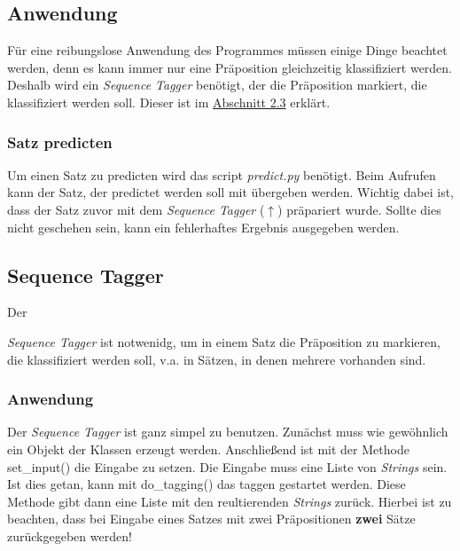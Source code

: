 \documentclass[10pt,a4paper]{article}
\begin{document}
\subsection{Anwendung}
\begin{flushleft}
Für eine reibungslose Anwendung des Programmes müssen einige Dinge beachtet werden, denn es kann immer nur eine Präposition gleichzeitig klassifiziert werden. Deshalb wird ein \textit{Sequence Tagger} benötigt, der die Präposition markiert, die klassifiziert werden soll. Dieser ist im \hyperlink{SeqTag}{Abschnitt 2.3} erklärt.
\end{flushleft}

\subsubsection{Satz predicten}
\begin{flushleft}
Um einen Satz zu predicten wird das script \textit{predict.py} benötigt. Beim Aufrufen kann der Satz, der predictet werden soll mit übergeben werden. Wichtig dabei ist, dass der Satz zuvor mit dem \textit{Sequence Tagger} (\hyperlink{SeqTag}{$\uparrow$}) präpariert wurde. Sollte dies nicht geschehen sein, kann ein fehlerhaftes Ergebnis ausgegeben werden.
\end{flushleft}

\subsection{Sequence Tagger}
\begin{flushleft}
\hypertarget{SeqTag}{Der} \textit{Sequence Tagger} ist notwenidg, um in einem Satz die Präposition zu markieren, die klassifiziert werden soll, v.a. in Sätzen, in denen mehrere vorhanden sind.
\end{flushleft}

\subsubsection{Anwendung}
\begin{flushleft}
Der \textit{Sequence Tagger} ist ganz simpel zu benutzen. Zunächst muss wie gewöhnlich ein Objekt der Klassen erzeugt werden. Anschließend ist mit der Methode set\_input() die Eingabe zu setzen. Die Eingabe muss eine Liste von \textit{Strings} sein. Ist dies getan, kann mit do\_tagging() das taggen gestartet werden. Diese Methode gibt dann eine Liste mit den reultierenden \textit{Strings} zurück. Hierbei ist zu beachten, dass bei Eingabe eines Satzes mit zwei Präpositionen \textbf{zwei} Sätze zurückgegeben werden!
\end{flushleft}
\end{document}
